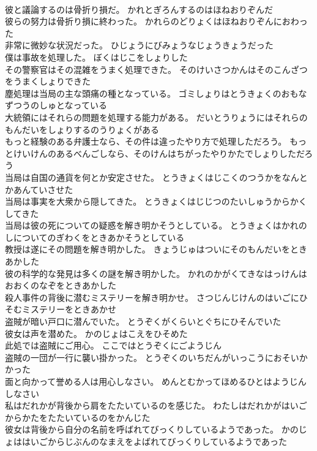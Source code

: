 \documentclass[8pt]{extreport}
\begin{document}
\begin{CJK}{UTF8}{min}
\\	彼と議論するのは骨折り損だ。	かれとぎろんするのはほねおりぞんだ 
\\	彼らの努力は骨折り損に終わった。	かれらのどりょくはほねおりぞんにおわった 
\\	非常に微妙な状況だった。	ひじょうにびみょうなじょうきょうだった 
\\	僕は事故を処理した。	ぼくはじこをしょりした 
\\	その警察官はその混雑をうまく処理できた。	そのけいさつかんはそのこんざつをうまくしょりできた 
\\	塵処理は当局の主な頭痛の種となっている。	ゴミしょりはとうきょくのおもなずつうのしゅとなっている 
\\	大統領にはそれらの問題を処理する能力がある。	だいとうりょうにはそれらのもんだいをしょりするのうりょくがある 
\\	もっと経験のある弁護士なら、その件は違ったやり方で処理しただろう。	もっとけいけんのあるべんごしなら、そのけんはちがったやりかたでしょりしただろう 
\\	当局は自国の通貨を何とか安定させた。	とうきょくはじこくのつうかをなんとかあんていさせた 
\\	当局は事実を大衆から隠してきた。	とうきょくはじじつのたいしゅうからかくしてきた 
\\	当局は彼の死についての疑惑を解き明かそうとしている。	とうきょくはかれのしについてのぎわくをときあかそうとしている 
\\	教授は遂にその問題を解き明かした。	きょうじゅはついにそのもんだいをときあかした 
\\	彼の科学的な発見は多くの謎を解き明かした。	かれのかがくてきなはっけんはおおくのなぞをときあかした 
\\	殺人事件の背後に潜むミステリーを解き明かせ。	さつじんじけんのはいごにひそむミステリーをときあかせ 
\\	盗賊が暗い戸口に潜んでいた。	とうぞくがくらいとぐちにひそんでいた 
\\	彼女は声を潜めた。	かのじょはこえをひそめた 
\\	此処では盗賊にご用心。	ここではとうぞくにごようじん 
\\	盗賊の一団が一行に襲い掛かった。	とうぞくのいちだんがいっこうにおそいかかった 
\\	面と向かって誉める人は用心しなさい。	めんとむかってほめるひとはようじんしなさい 
\\	私はだれかが背後から肩をたたいているのを感じた。	わたしはだれかがはいごからかたをたたいているのをかんじた 
\\	彼女は背後から自分の名前を呼ばれてびっくりしているようであった。	かのじょははいごからじぶんのなまえをよばれてびっくりしているようであった 

\end{CJK}
\end{document}
